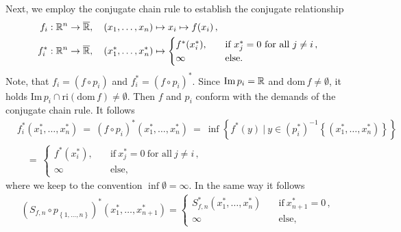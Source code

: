 \begin{example}
  Next, we employ the conjugate chain rule to establish the conjugate relationship 
  \begin{align*}
    f_i&:\R^n\to \overline{\R}
    ,
    \quad
    (x_1,\ldots,x_n)
    \mapsto x_i \mapsto f(x_i)
    \,,
    \\
    f^*_i&:\R^n\to \overline{\R}
    ,
    \quad
    (x^*_1,\ldots,x^*_n)\mapsto 
    \begin{cases}
      f^*(x_i^*),
      \quad
      &\text{if}\ 
      x_j^*=0\ \text{for all}\ j\neq i\,,
      \\
      \infty
      \quad
      &\text{else.}
    \end{cases}
  \end{align*}
  Note, that 
  $
    f_i
    =
    (f\circ p_i)
  $
  and
  $
    f^*_i
    =
    (f\circ p_i)^*
  $.
  Since 
  $
    \mathrm{Im}\,p_i=\mathbb{R}
  $
  and 
  $
    \mathrm{dom}\, f
    \neq
    \emptyset
  $,
  it holds
  $
    \mathrm{Im}\, p_i
    \cap
    \mathrm{ri}(
    \mathrm{dom}\, f
    )
    \neq
    \emptyset
  $.
  Then $f$ and $p_i$ conform with the demands of the conjugate chain rule.
  It follows
  \begin{align*}
    &f_i^*
    (x^*_1,\ldots,x^*_n) 
    \ 
    =
    \ 
    (f\circ p_i)^*
    (x^*_1,\ldots,x^*_n) 
    \ =
    \ 
    \inf
    \left\{ 
    f^*(y)
    \ 
    |
    \ 
    y\in 
    (p_i^*)^{-1}
    \left\{ 
    (x_1^*,\ldots,x_n^*)
    \right\}
    \right\}
    \\
    &\quad=
    \ 
    \begin{cases}
      f^*(x_i^*),
      \quad
      &\text{if}\ 
      x_j^*=0\ \text{for all}\ j\neq i\,,
      \\
      \infty
      \quad
      &\text{else,}
    \end{cases}
  \end{align*}
  where we keep to the convention $\inf\emptyset=\infty$.
  In the same way it follows
  \begin{gather}
    \left( 
      S_{f,n}
      \circ
      p_{\left\{ 1,\ldots,n \right\}}
    \right)^*
    (x^*_1,\ldots,x^*_{n+1})
    =
    \begin{cases}
      S_{f,n}^*
    (x^*_1,\ldots,x^*_{n})
      \quad
      &\text{if}\ 
      x_{n+1}^*=0\,,
      \\
      \infty
      \quad
      &\text{else,}
    \end{cases}
  \end{gather}


\end{example}
